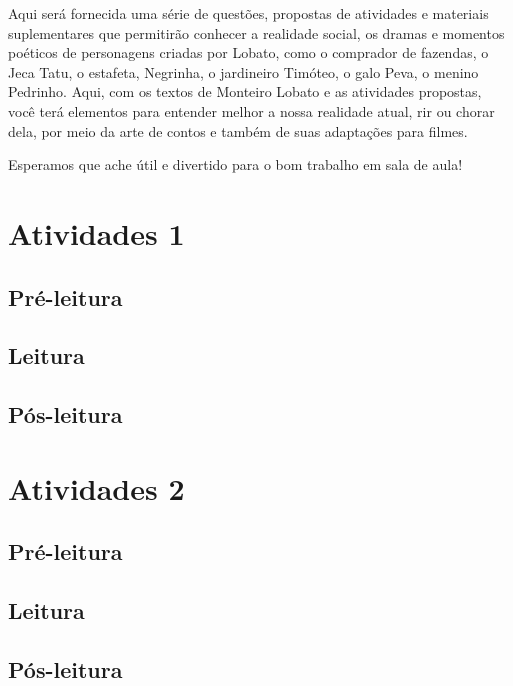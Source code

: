 \documentclass{article}
\begin{document}
Aqui será fornecida uma série de questões, propostas de atividades e
materiais suplementares que permitirão conhecer a realidade social, os
dramas e momentos poéticos de personagens criadas por Lobato, como o
comprador de fazendas, o Jeca Tatu, o estafeta, Negrinha, o jardineiro
Timóteo, o galo Peva, o menino Pedrinho. Aqui, com os textos de Monteiro
Lobato e as atividades propostas, você terá elementos para entender
melhor a nossa realidade atual, rir ou chorar dela, por meio da arte de
contos e também de suas adaptações para filmes.

Esperamos que ache útil e divertido para o bom trabalho em sala de aula!

\section{Atividades 1}

\subsection{Pré-leitura}


\subsection{Leitura}
\subsection{Pós-leitura}



\section{Atividades 2}

\subsection{Pré-leitura}
\subsection{Leitura}
\subsection{Pós-leitura}

\lipsum
\end{document}
